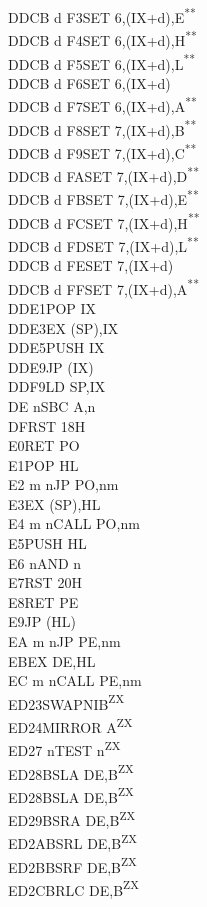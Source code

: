 \documentclass[12pt,twoside,openright,a4paper]{book}
\newcommand{\UNDOC}{\textnormal{\textsuperscript{**}}}
\newcommand{\ZXN}{\textnormal{\textsuperscript{ZX}}}
\begin{document}
\begin{multicols}{3}
{\begin{tabbing}
	DDCB d F3\>SET 6,(IX+d),E\UNDOC\\
	DDCB d F4\>SET 6,(IX+d),H\UNDOC\\
	DDCB d F5\>SET 6,(IX+d),L\UNDOC\\
	DDCB d F6\>SET 6,(IX+d)\\
	DDCB d F7\>SET 6,(IX+d),A\UNDOC\\
	DDCB d F8\>SET 7,(IX+d),B\UNDOC\\
	DDCB d F9\>SET 7,(IX+d),C\UNDOC\\
	DDCB d FA\>SET 7,(IX+d),D\UNDOC\\
	DDCB d FB\>SET 7,(IX+d),E\UNDOC\\
	DDCB d FC\>SET 7,(IX+d),H\UNDOC\\
	DDCB d FD\>SET 7,(IX+d),L\UNDOC\\
	DDCB d FE\>SET 7,(IX+d)\\
	DDCB d FF\>SET 7,(IX+d),A\UNDOC\\
	DDE1\>POP IX\\
	DDE3\>EX (SP),IX\\
	DDE5\>PUSH IX\\
	DDE9\>JP (IX)\\
	DDF9\>LD SP,IX\\
	DE n\>SBC A,n\\
	DF\>RST 18H\\
	E0\>RET PO\\
	E1\>POP HL\\
	E2 m n\>JP PO,nm\\
	E3\>EX (SP),HL\\
	E4 m n\>CALL PO,nm\\
	E5\>PUSH HL\\
	E6 n\>AND n\\
	E7\>RST 20H\\
	E8\>RET PE\\
	E9\>JP (HL)\\
	EA m n\>JP PE,nm\\
	EB\>EX DE,HL\\
	EC m n\>CALL PE,nm\\
	ED23\>SWAPNIB\ZXN\\
	ED24\>MIRROR A\ZXN\\
	ED27 n\>TEST n\ZXN\\
	ED28\>BSLA DE,B\ZXN\\
	ED28\>BSLA DE,B\ZXN\\
	ED29\>BSRA DE,B\ZXN\\
	ED2A\>BSRL DE,B\ZXN\\
	ED2B\>BSRF DE,B\ZXN\\
	ED2C\>BRLC DE,B\ZXN\\

\end{tabbing}}
\end{multicols}
\end{document}
